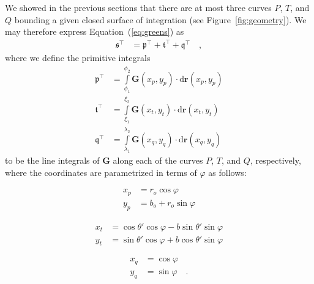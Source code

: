 \documentclass[modern]{aastex62}
\newcommand{\dd}{\ensuremath{\mathrm{d}}}
\newcommand{\sT}{\ensuremath{\mathfrak{s}^\top}}
\begin{document}
We showed in the previous sections that there are at most three curves
$P$, $T$, and $Q$ bounding a given closed surface of integration
(see Figure~\ref{fig:geometry}). We may therefore express
Equation~(\ref{eq:greens}) as
%
\begin{align}
    \label{eq:sT}
    \sT & =
    \mathfrak{p}^\top + \mathfrak{t}^\top + \mathfrak{q}^\top
    \quad,
\end{align}
%
where we define the primitive integrals
%
\begin{align}
    \label{eq:pT}
    \mathfrak{p}^\top
     & =
    \int\limits_{\phi_1}^{\phi_2}
    \mathbf{G}(x_p, y_p)
    \cdot \dd \mathbf{r}(x_p, y_p)
    \\
    \label{eq:tT}
    \mathfrak{t}^\top
     & =
    \int\limits_{\xi_1}^{\xi_2}
    \mathbf{G}(x_t, y_t)
    \cdot \dd \mathbf{r}(x_t, y_t)
    \\
    \label{eq:qT}
    \mathfrak{q}^\top
     & =
    \int\limits_{\lambda_1}^{\lambda_2}
    \mathbf{G}(x_q, y_q)
    \cdot \dd \mathbf{r}(x_q, y_q)
\end{align}
%
to be the line integrals of $\mathbf{G}$ along each of the curves
$P$, $T$, and $Q$, respectively, where the coordinates are parametrized
in terms of $\varphi$ as follows:
%
\\[1em]
%
\begin{minipage}{0.31\linewidth}
    \begin{align}
        x_p & = r_o \cos\varphi
        \nonumber                     \\
        y_p & = b_o + r_o \sin\varphi
        \nonumber
    \end{align}
\end{minipage}
%
\begin{minipage}{0.35\linewidth}
    \begin{align}
        x_t & = \cos\theta' \cos\varphi - b \sin\theta' \sin\varphi
        \nonumber                                                   \\
        y_t & = \sin\theta' \cos\varphi + b \cos\theta' \sin\varphi
        \nonumber
    \end{align}
\end{minipage}
%
\begin{minipage}{0.31\linewidth}
    \begin{align}
        \label{eq:xy_pqt}
        x_q & =\cos\varphi
        \nonumber           \\
        y_q & = \sin\varphi
        \quad.
    \end{align}
\end{minipage}
%
\\[1em]
\end{document}
